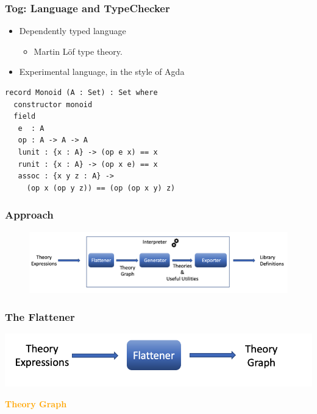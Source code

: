 \documentclass[t,10pt,numbers,fleqn,usenames,xcolor=dvipsnames]{beamer}
\begin{document}
\begin{frame}[fragile]
\frametitle{Tog: Language and TypeChecker}
\begin{itemize}
    \item Dependently typed language 
    \begin{itemize}
        \item Martin L\"{o}f type theory. 
    \end{itemize}
    \item Experimental language, in the style of Agda 
\end{itemize}
\begin{verbatim}
record Monoid (A : Set) : Set where
  constructor monoid
  field
   e  : A
   op : A -> A -> A
   lunit : {x : A} -> (op e x) == x
   runit : {x : A} -> (op x e) == x
   assoc : {x y z : A} -> 
     (op x (op y z)) == (op (op x y) z)
\end{verbatim}
\end{frame}

\begin{frame}[fragile]
\frametitle{Approach} 
\begin{figure}
    \includegraphics[scale=0.2]{figures/interpreter_detailed.png}
\end{figure}
\end{frame}

\begin{frame}[fragile] 
\frametitle{The Flattener} 

\begin{center}
\includegraphics[scale=0.2]{figures/flattener.png}
\end{center}

\textcolor{Orange}{\textbf{Theory Graph}}


\end{frame}
\end{document}

